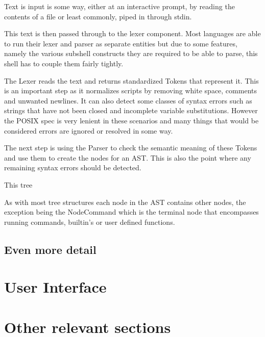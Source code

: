 Text is input is some way, either at an interactive prompt, by reading the contents of a file or least commonly, piped in through stdin.

This text is then passed through to the lexer component.
Most languages are able to run their lexer and parser as separate entities but due to some  features, namely the various subshell constructs they are required to be able to parse, this shell has to couple them fairly tightly.

The Lexer reads the text and returns standardized Tokens that represent it.
This is an important step as it normalizes scripts by removing white space, comments and unwanted newlines.
It can also detect some classes of syntax errors such as strings that have not been closed and incomplete variable substitutions.
However the POSIX spec is very lenient in these scenarios and many things that would be considered errors are ignored or resolved in some way. %

The next step is using the Parser to check the semantic meaning of these Tokens and use them to create the nodes for an AST.
This is also the point where any remaining syntax errors should be detected.


This tree 

As with most tree structures each node in the AST contains other nodes, the exception being the NodeCommand which is the terminal node that encompasses running commands, builtin's or user defined functions.









\subsection{Even more detail}

\section{User Interface}

\section{Other relevant sections}